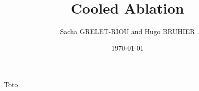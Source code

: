 \documentclass[11pt]{beamer}
\author{Sacha GRELET-RIOU and Hugo BRUHIER}
\title{Cooled Ablation}
\institute{Télécom Saint-Étienne}
\date{\today}
\begin{document}
\begin{frame}
\titlepage
\end{frame}

\begin{frame}
\tableofcontents
\end{frame}

\begin{frame}{Toto}

\end{frame}
\end{document}

